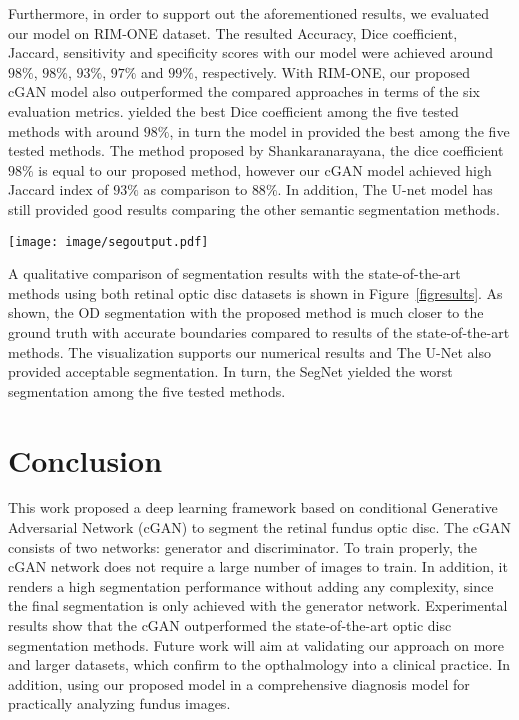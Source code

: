 \documentclass{IOS-Book-Article}
\begin{document}
Furthermore, in order to support out the aforementioned results, we evaluated our model on RIM-ONE dataset. The resulted Accuracy, Dice coefficient, Jaccard, sensitivity and specificity scores with our model were achieved around $98\%$, $98\%$, $93\%$, $97\%$ and $99\%$, respectively. With RIM-ONE, our proposed cGAN model also outperformed the compared approaches in terms of the six evaluation metrics. \cite{shankaranarayana2017joint} yielded the best Dice coefficient among the five tested methods with around $98\%$, in turn the model in \cite{zilly2015boosting} provided the best among the five tested methods. The method proposed by Shankaranarayana\cite{shankaranarayana2017joint}, the dice coefficient $98\%$ is equal to our proposed method, however our cGAN model achieved high Jaccard index of $93\%$ as comparison to $88\%$. In addition, The U-net model has still provided good results comparing the other semantic segmentation methods.

\begin{figure*}
\centering
\texttt{[image: image/segoutput.pdf]}
\caption{ Examples of the retinal optic disc segmentation : (col 1) retinal optic disc images, (col 2) ground-truth masks, (col 3) FCN, (col 4) U-Net, (col 5) SegNet and (col 6) generated masks with the cGAN. 
}
\label{figresults}
\end{figure*}

A qualitative comparison of segmentation results with the state-of-the-art methods using both retinal optic disc datasets is shown in Figure~\ref{figresults}. As shown, the OD segmentation with the proposed method is much closer to the ground truth with accurate boundaries compared to results of the state-of-the-art methods. The visualization supports our numerical results and The U-Net also provided acceptable segmentation. In turn, the SegNet yielded the worst segmentation among the five tested methods.




\section{Conclusion}
This work proposed a deep learning framework based on conditional Generative Adversarial Network (cGAN) to segment the retinal fundus optic disc. The cGAN consists of two networks: generator and discriminator. To train properly, the cGAN network does not require a large number of images to train. In addition, it renders a high segmentation performance without adding any complexity, since the final segmentation is only achieved with the generator network. Experimental results show that the cGAN outperformed the state-of-the-art optic disc segmentation methods. Future work will aim at validating our approach on more and larger datasets, which confirm to the opthalmology into a clinical practice. In addition, using  our proposed model in a comprehensive diagnosis model for practically analyzing fundus images.





\end{document}
